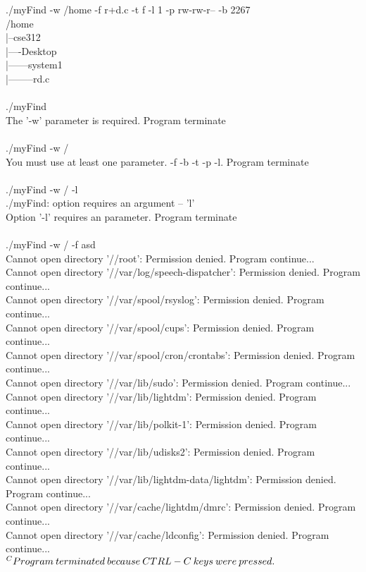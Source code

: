\documentclass{article}
\begin{document}
./myFind -w /home -f r+d.c -t f -l 1 -p rw-rw-r-- -b 2267\\
/home\\
|--cse312\\
|----Desktop\\
|------system1\\
|--------rd.c\\
\\

./myFind \\
The '-w' parameter is required. Program terminate\\
\\

./myFind -w /\\
You must use at least one parameter. -f -b -t -p -l. Program terminate\\
\\

./myFind -w / -l\\
./myFind: option requires an argument -- 'l'\\
Option '-l' requires an parameter. Program terminate\\
\\

./myFind -w / -f asd\\
Cannot open directory '//root': Permission denied. 	 Program continue...\\
Cannot open directory '//var/log/speech-dispatcher': Permission denied. 	 Program continue...\\
Cannot open directory '//var/spool/rsyslog': Permission denied. 	 Program continue...\\
Cannot open directory '//var/spool/cups': Permission denied. 	 Program continue...\\
Cannot open directory '//var/spool/cron/crontabs': Permission denied. 	 Program continue...\\
Cannot open directory '//var/lib/sudo': Permission denied. 	 Program continue...\\
Cannot open directory '//var/lib/lightdm': Permission denied. 	 Program continue...\\
Cannot open directory '//var/lib/polkit-1': Permission denied. 	 Program continue...\\
Cannot open directory '//var/lib/udisks2': Permission denied. 	 Program continue...\\
Cannot open directory '//var/lib/lightdm-data/lightdm': Permission denied. 	 Program continue...\\
Cannot open directory '//var/cache/lightdm/dmrc': Permission denied. 	 Program continue...\\
Cannot open directory '//var/cache/ldconfig': Permission denied. 	 Program continue...\\
$^C\\
Program\: terminated \:because \:CTRL-C \:keys\: were\: pressed.\\
$
\end{document}
